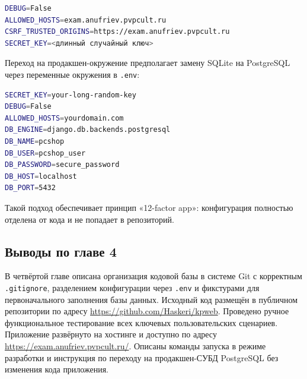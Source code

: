 \begin{lstlisting}[language=bash, caption={Ключевые параметры .env на сервере}]
DEBUG=False
ALLOWED_HOSTS=exam.anufriev.pvpcult.ru
CSRF_TRUSTED_ORIGINS=https://exam.anufriev.pvpcult.ru
SECRET_KEY=<длинный случайный ключ>
\end{lstlisting}

Переход на продакшен-окружение предполагает замену SQLite на PostgreSQL через переменные окружения в \texttt{.env}:

\begin{lstlisting}[language=bash, caption={Пример файла .env для PostgreSQL}]
SECRET_KEY=your-long-random-key
DEBUG=False
ALLOWED_HOSTS=yourdomain.com
DB_ENGINE=django.db.backends.postgresql
DB_NAME=pcshop
DB_USER=pcshop_user
DB_PASSWORD=secure_password
DB_HOST=localhost
DB_PORT=5432
\end{lstlisting}

Такой подход обеспечивает принцип «12-factor app»: конфигурация полностью отделена от кода и не попадает в репозиторий.

\subsection*{Выводы по главе 4}

В четвёртой главе описана организация кодовой базы в системе Git с корректным \texttt{.gitignore}, разделением конфигурации через \texttt{.env} и фикстурами для первоначального заполнения базы данных. Исходный код размещён в публичном репозитории по адресу \url{https://github.com/Haskeri/kpweb}. Проведено ручное функциональное тестирование всех ключевых пользовательских сценариев. Приложение развёрнуто на хостинге и доступно по адресу \url{https://exam.anufriev.pvpcult.ru/}. Описаны команды запуска в режиме разработки и инструкция по переходу на продакшен-СУБД PostgreSQL без изменения кода приложения.
